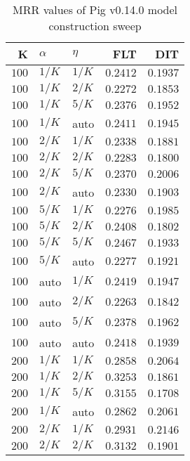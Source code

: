 
\begin{table}
\begin{spacing}{1.2}
\centering
\caption{MRR values of Pig v0.14.0 model construction sweep}
\label{table:pig_model_sweep}
\vspace{0.2em}
\parbox{.45\linewidth}{\centering \begin{tabular}{rll|rr}
\toprule
    K &  $\alpha$ &    $\eta$ & FLT &   DIT \\
\midrule
$100$ &  $1/K$ &  $1/K$ &         $0.2412$ & $0.1937$ \\
$100$ &  $1/K$ &  $2/K$ &         $0.2272$ & $0.1853$ \\
$100$ &  $1/K$ &  $5/K$ &         $0.2376$ & $0.1952$ \\
$100$ &  $1/K$ &   auto &         $0.2411$ & $0.1945$ \\
$100$ &  $2/K$ &  $1/K$ &         $0.2338$ & $0.1881$ \\
$100$ &  $2/K$ &  $2/K$ &         $0.2283$ & $0.1800$ \\
$100$ &  $2/K$ &  $5/K$ &         $0.2370$ & $0.2006$ \\
$100$ &  $2/K$ &   auto &         $0.2330$ & $0.1903$ \\
$100$ &  $5/K$ &  $1/K$ &         $0.2276$ & $0.1985$ \\
$100$ &  $5/K$ &  $2/K$ &         $0.2408$ & $0.1802$ \\
$100$ &  $5/K$ &  $5/K$ &         $0.2467$ & $0.1933$ \\
$100$ &  $5/K$ &   auto &         $0.2277$ & $0.1921$ \\
$100$ &   auto &  $1/K$ &         $0.2419$ & $0.1947$ \\
$100$ &   auto &  $2/K$ &         $0.2263$ & $0.1842$ \\
$100$ &   auto &  $5/K$ &         $0.2378$ & $0.1962$ \\
$100$ &   auto &   auto &         $0.2418$ & $0.1939$ \\
$200$ &  $1/K$ &  $1/K$ &         $0.2858$ & $0.2064$ \\
$200$ &  $1/K$ &  $2/K$ &         $0.3253$ & $0.1861$ \\
$200$ &  $1/K$ &  $5/K$ &         $0.3155$ & $0.1708$ \\
$200$ &  $1/K$ &   auto &         $0.2862$ & $0.2061$ \\
$200$ &  $2/K$ &  $1/K$ &         $0.2931$ & $0.2146$ \\
$200$ &  $2/K$ &  $2/K$ &         $0.3132$ & $0.1901$ \\

\end{tabular}}
\end{spacing}
\end{table}
